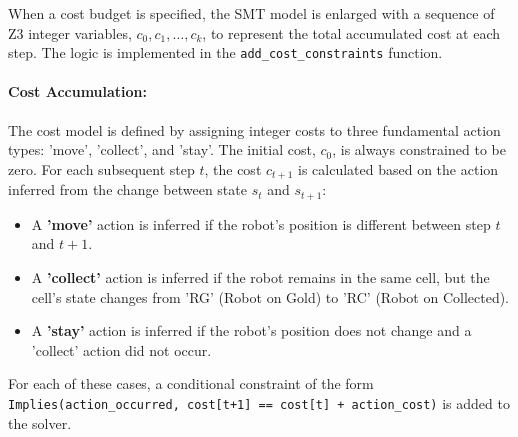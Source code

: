 \documentclass[12pt, a4paper, oneside]{report} %
\begin{document}
When a cost budget is specified, the SMT model is enlarged with a sequence of Z3 integer variables, $c_0, c_1, \dots, c_k$, to represent the total accumulated cost at each step. The logic is implemented in the \texttt{add\_cost\_constraints} function.

\paragraph{Cost Accumulation:}
The cost model is defined by assigning integer costs to three fundamental action types: 'move', 'collect', and 'stay'. The initial cost, $c_0$, is always constrained to be zero. For each subsequent step $t$, the cost $c_{t+1}$ is calculated based on the action inferred from the change between state $s_t$ and $s_{t+1}$:
\begin{itemize}
    \item A \textbf{'move'} action is inferred if the robot's position is different between step $t$ and $t+1$.
    \item A \textbf{'collect'} action is inferred if the robot remains in the same cell, but the cell's state changes from 'RG' (Robot on Gold) to 'RC' (Robot on Collected).
    \item A \textbf{'stay'} action is inferred if the robot's position does not change and a 'collect' action did not occur.
\end{itemize}
For each of these cases, a conditional constraint of the form \\ \texttt{Implies(action\_occurred, cost[t+1] == cost[t] + action\_cost)} is added to the solver.
\end{document}
